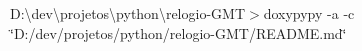 D\+:\textbackslash{}dev\textbackslash{}projetos\textbackslash{}python\textbackslash{}relogio-\/GMT\texorpdfstring{$>$}{>}doxypypy -\/a -\/c \char`\"{}\+D\+:/dev/projetos/python/relogio-\/\+GMT/\+README.\+md\char`\"{} 